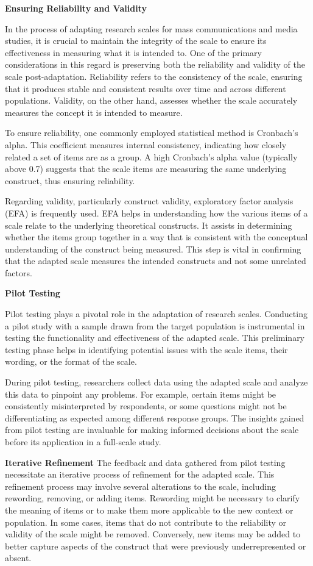 \documentclass[
]{book}
\begin{document}
\textbf{Ensuring Reliability and Validity}

In the process of adapting research scales for mass communications and media studies, it is crucial to maintain the integrity of the scale to ensure its effectiveness in measuring what it is intended to. One of the primary considerations in this regard is preserving both the reliability and validity of the scale post-adaptation. Reliability refers to the consistency of the scale, ensuring that it produces stable and consistent results over time and across different populations. Validity, on the other hand, assesses whether the scale accurately measures the concept it is intended to measure.

To ensure reliability, one commonly employed statistical method is Cronbach's alpha. This coefficient measures internal consistency, indicating how closely related a set of items are as a group. A high Cronbach's alpha value (typically above 0.7) suggests that the scale items are measuring the same underlying construct, thus ensuring reliability.

Regarding validity, particularly construct validity, exploratory factor analysis (EFA) is frequently used. EFA helps in understanding how the various items of a scale relate to the underlying theoretical constructs. It assists in determining whether the items group together in a way that is consistent with the conceptual understanding of the construct being measured. This step is vital in confirming that the adapted scale measures the intended constructs and not some unrelated factors.

\textbf{Pilot Testing}

Pilot testing plays a pivotal role in the adaptation of research scales. Conducting a pilot study with a sample drawn from the target population is instrumental in testing the functionality and effectiveness of the adapted scale. This preliminary testing phase helps in identifying potential issues with the scale items, their wording, or the format of the scale.

During pilot testing, researchers collect data using the adapted scale and analyze this data to pinpoint any problems. For example, certain items might be consistently misinterpreted by respondents, or some questions might not be differentiating as expected among different response groups. The insights gained from pilot testing are invaluable for making informed decisions about the scale before its application in a full-scale study.

\textbf{Iterative Refinement}
The feedback and data gathered from pilot testing necessitate an iterative process of refinement for the adapted scale. This refinement process may involve several alterations to the scale, including rewording, removing, or adding items. Rewording might be necessary to clarify the meaning of items or to make them more applicable to the new context or population. In some cases, items that do not contribute to the reliability or validity of the scale might be removed. Conversely, new items may be added to better capture aspects of the construct that were previously underrepresented or absent.
\end{document}
